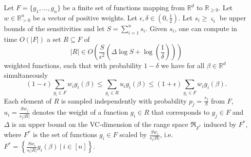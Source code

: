 \begin{theorem}
    \label{theorem:sensitivity-framework}
    Let $F = \{ g_1, ..., g_n \}$ be a finite set of functions
    mapping from $\mathbb{R}^d$ to $\mathbb{R}_{\geq 0}$.
    Let $w \in \mathbb{R}^n_{>0}$ be a vector of positive weights.
    Let $\epsilon, \delta \in (0, \frac{1}{2})$.
    Let $s_i \geq \varsigma_i$ be upper bounds of the sensitivities and
    let $S = \sum_{i=1}^n s_i$.
    Given $s_i$, one can compute in time $O(|F|)$ a set
    $R \subseteq F$ of
    \begin{equation*}
        |R| \in O \left( \frac{S}{\epsilon^2} \left( \Delta \log S + \log \left( \frac{1}{\delta} \right) \right) \right)
    \end{equation*}
    weighted functions, such that with probability $1 - \delta$ we have
    for all $\beta \in \mathbb{R}^d$ simultaneously
    \begin{equation*}
        (1-\epsilon) \sum_{g_i \in F} w_i g_i(\beta) \leq \sum_{g_i \in R} u_i g_i(\beta) \leq (1 + \epsilon) \sum_{g_i \in F} w_i g_i(\beta).
    \end{equation*}
    Each element of $R$ is sampled independently with probability
    $p_j = \frac{s_j}{S}$ from $F$, $u_i = \frac{S w_j}{s_j |R|}$
    denotes the weight of a function $g_i \in R$ that corresponds to
    $g_j \in F$ and $\Delta$ is an upper bound on the
    VC-dimension of the range space $\mathfrak{R}_{F^\ast}$ induced by
    $F^\ast$, where $F^\ast$ is the set of functions $g_i \in F$
    scaled by $\frac{S w_i}{s_i |R|}$, i.e.
    $F^\ast = \left\{ \frac{S w_i}{s_i |R|} g_i(\beta) \ |\ i \in [n] \right\}$.
\end{theorem}

